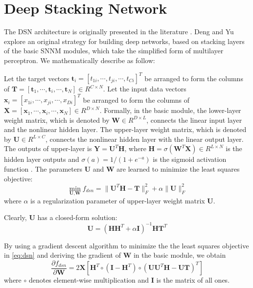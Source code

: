 \documentclass[letterpaper]{article}
\begin{document}
\section{Deep Stacking Network}
\label{sec:dsn}
The DSN architecture is originally presented in the literature \cite{Deng2011b}. Deng and Yu explore an original strategy for building deep networks, based on stacking layers of the basic SNNM modules, which take the simplified form of multilayer perceptron. We mathematically describe as follow:

Let the target vectors $\textbf{t}_i=[t_{1i},\cdots,t_{ji},\cdots,t_{Ci}]^T$ be arranged to form the columns of $\textbf{T}=[\textbf{t}_1,\cdots,\textbf{t}_i,\cdots,\textbf{t}_N]\in R^{C\times N}$. Let the input data vectors $\textbf{x}_i=[x_{1i},\cdots,x_{ji},\cdots,x_{Di}]^T$ be arranged to form the columns of $\textbf{X}=[\textbf{x}_1,\cdots,\textbf{x}_i,\cdots,\textbf{x}_N]\in R^{D\times N}$. Formally, in the basic module, the lower-layer weight matrix, which is denoted by $\textbf{W}\in R^{D\times L}$, connects the linear input layer and the nonlinear hidden layer. The upper-layer weight matrix, which is denoted by $\textbf{U}\in R^{L\times C}$, connects the nonlinear hidden layer with the linear output layer. The outputs of upper-layer is $\textbf{Y}=\textbf{U}^T\textbf{H}$, where $\textbf{H}=\sigma(\textbf{W}^T\textbf{X})\in R^{L\times N}$ is the hidden layer outputs and $\sigma(a)=1/(1 + e^{-a})$ is the sigmoid activation function \cite{Deng2011a,Deng2011b}. The parameters $\textbf{U}$ and $\textbf{W}$ are learned to minimize the least squares objective:
\begin{equation}
\min_{\textbf{U},\textbf{W}}f_{dsn} = \|\textbf{U}^T\textbf{H}-\textbf{T}\|^2_F+\alpha\|\textbf{U}\|^2_F
\label{eq:dsn}
\end{equation}
where $\alpha$ is a regularization parameter of upper-layer weight matrix $\textbf{U}$.

Clearly, $\textbf{U}$ has a closed-form solution:
\begin{equation}
\textbf{U}=(\textbf{H}\textbf{H}^T+\alpha \textbf{I})^{-1}\textbf{H}\textbf{T}^T
\label{eq:dsnsloveu}
\end{equation}

By using a gradient descent \cite{Deng2011b} algorithm to minimize the the least squares objective in \eqref{eq:dsn} and deriving the gradient of $\textbf{W}$ in the basic module, we obtain
\begin{equation}
\frac{\partial f_{dsn} }{\partial \textbf{W}}=2\textbf{X}\left[\textbf{H}^T\circ(\textbf{I}-\textbf{H}^T)\circ(\textbf{U}\textbf{U}^T\textbf{H}-\textbf{U}\textbf{T})^T\right]
\label{eq:dsnslovew}
\end{equation}
where $\circ$ denotes element-wise multiplication and $\textbf{I}$ is the matrix of all ones.
\end{document}
